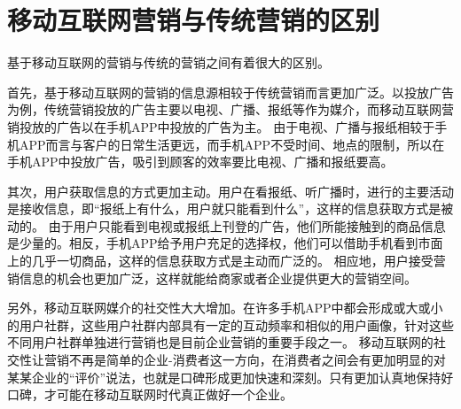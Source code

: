 \documentclass[a4paper]{article}
\begin{document}
\section{移动互联网营销与传统营销的区别}
	基于移动互联网的营销与传统的营销之间有着很大的区别。\par
	首先，基于移动互联网的营销的信息源相较于传统营销而言更加广泛。以投放广告为例，传统营销投放的广告主要以电视、广播、报纸等作为媒介，而移动互联网营销投放的广告以在手机APP中投放的广告为主。
	由于电视、广播与报纸相较于手机APP而言与客户的日常生活更远，而手机APP不受时间、地点的限制，所以在手机APP中投放广告，吸引到顾客的效率要比电视、广播和报纸要高。\par
	其次，用户获取信息的方式更加主动。用户在看报纸、听广播时，进行的主要活动是接收信息，即“报纸上有什么，用户就只能看到什么”，这样的信息获取方式是被动的。
	由于用户只能看到电视或报纸上刊登的广告，他们所能接触到的商品信息是少量的。相反，手机APP给予用户充足的选择权，他们可以借助手机看到市面上的几乎一切商品，这样的信息获取方式是主动而广泛的。
	相应地，用户接受营销信息的机会也更加广泛，这样就能给商家或者企业提供更大的营销空间。\par
	另外，移动互联网媒介的社交性大大增加。在许多手机APP中都会形成或大或小的用户社群，这些用户社群内部具有一定的互动频率和相似的用户画像，针对这些不同用户社群单独进行营销也是目前企业营销的重要手段之一。
	移动互联网的社交性让营销不再是简单的企业-消费者这一方向，在消费者之间会有更加明显的对某某企业的“评价”说法，也就是口碑形成更加快速和深刻。只有更加认真地保持好口碑，才可能在移动互联网时代真正做好一个企业。

\end{document}
